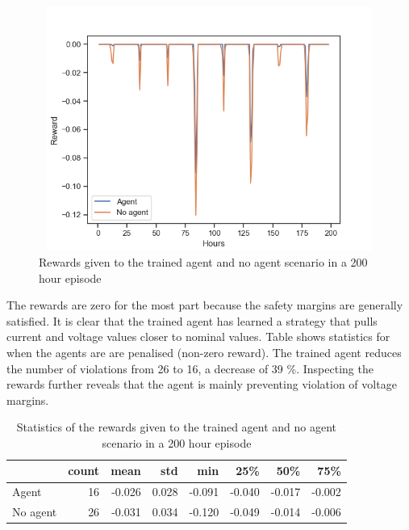 \documentclass[class=book, crop=false]{standalone}
\begin{document}
\begin{figure}[ht]
    \center
\includegraphics[height=8cm, width=12cm]{figures/reward_200_steps_config1.png}
    \caption[size = 9]{Rewards given to the trained agent and no agent scenario in a 200 hour episode}
    \label{fig:results:configuration1_reward_200_hours}
\end{figure}



The rewards are zero for the most part because the safety margins are generally satisfied. It is clear that the trained agent has learned a strategy that pulls current and voltage values closer to nominal values. Table \label{table:results:configuration1_reward_200_hours} shows statistics for when the agents are are penalised (non-zero reward). The trained agent reduces the number of violations from 26 to 16, a decrease of 39 \%.  Inspecting the rewards further reveals that the agent is mainly preventing violation of voltage margins.

\begin{table}[ht]
\label{table:results:configuration1_reward_200_hours}
\caption{Statistics of the rewards given to the trained agent and no agent scenario in a 200 hour episode}

\center
\begin{tabular}{l|rrrrrrr}
         & count  & mean   & std   & min    & 25\%   & 50\%   & 75\%   \\
\hline
Agent    & 16 & -0.026 & 0.028 & -0.091 & -0.040 & -0.017 & -0.002 \\
No agent & 26 & -0.031 & 0.034 & -0.120 & -0.049 & -0.014 & -0.006\\
\hline
\end{tabular}
\end{table}
\end{document}
